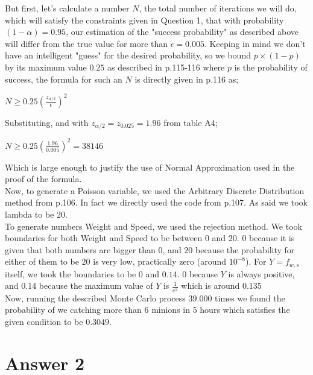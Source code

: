 \documentclass[12pt]{article}
\begin{document}
But first, let's calculate a number $N$, the total number of iterations we will do, which will satisfy the constraints given in Question 1, that with probability $(1-\alpha)=0.95$, our estimation of the "success probability" as described above will differ from the true value for more than $\epsilon=0.005$. Keeping in mind we don't have an intelligent "guess" for the desired probability, so we bound $p\times(1-p)$ by its maximum value $0.25$ as described in p.115-116 where $p$ is the probability of success, the formula for such an $N$ is directly given in p.116 as;

\begin{center}
$N\geq 0.25(\frac{z_{\alpha/2}}{\epsilon})^2$
\end{center}

Substituting, and with $z_{\alpha/2}=z_{0.025}=1.96$ from table A4;

\begin{center}
$N \geq 0.25(\frac{1.96}{0.005})^2 = 38146$
\end{center}

Which is large enough to justify the use of Normal Approximation used in the proof of the formula.\\

Now, to generate a Poisson variable, we used the Arbitrary Discrete Distribution method from p.106. In fact we directly used the code from p.107. As said we took lambda to be $20$. \\

To generate numbers Weight and Speed, we used the rejection method. We took boundaries for both Weight and Speed to be between $0$ and $20$. $0$ because it is given that both numbers are bigger than $0$, and $20$ because the probability for either of them to be $20$ is very low, practically zero (around $10^{-8}$). For $Y=f_{w,s}$ itself, we took the boundaries to be $0$ and $0.14$. $0$ because $Y$ is always positive, and $0.14$ because the maximum value of $Y$ is $\frac{1}{e^2}$ which is around $0.135$ \\

Now, running the described Monte Carlo process $39.000$ times we found the probability of we catching more than 6 minions in 5 hours which satisfies the given condition to be $0.3049$.



\section*{Answer 2}
\end{document}
